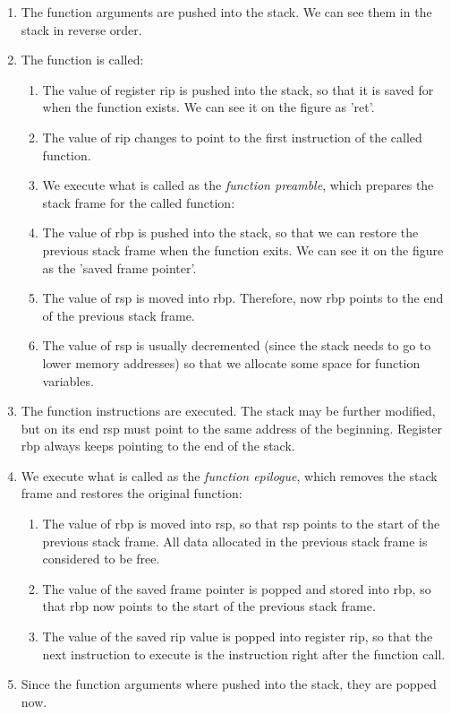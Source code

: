 \documentclass[12pt]{report} %
\begin{document}
\begin{enumerate}
\item The function arguments are pushed into the stack. We can see them in the stack in reverse order. 
\item The function is called:
\begin{enumerate}
	\item The value of register rip is pushed into the stack, so that it is saved for when the function exists. We can see it on the figure as 'ret'.
	\item The value of rip changes to point to the first instruction of the called function.
\item We execute what is called as the \textit{function preamble}\cite{8664_params_abi_p18}, which prepares the stack frame for the called function:
	\item The value of rbp is pushed into the stack, so that we can restore the previous stack frame when the function exits. We can see it on the figure as the 'saved frame pointer'.
	\item The value of rsp is moved into rbp. Therefore, now rbp points to the end of the previous stack frame.
	\item The value of rsp is usually decremented (since the stack needs to go to lower memory addresses) so that we allocate some space for function variables.
\end{enumerate}
\item The function instructions are executed. The stack may be further modified, but on its end rsp must point to the same address of the beginning. Register rbp always keeps pointing to the end of the stack.
\item We execute what is called as the \textit{function epilogue}, which removes the stack frame and restores the original function:
\begin{enumerate}
	\item The value of rbp is moved into rsp, so that rsp points to the start of the previous stack frame. All data allocated in the previous stack frame is considered to be free.
	\item The value of the saved frame pointer is popped and stored into rbp, so that rbp now points to the start of the previous stack frame.
	\item The value of the saved rip value is popped into register rip, so that the next instruction to execute is the instruction right after the function call.
\end{enumerate}
\item Since the function arguments where pushed into the stack, they are popped now.
\end{enumerate}
\end{document}
